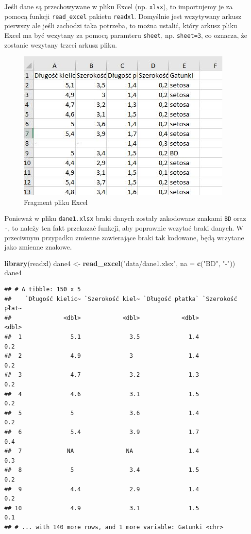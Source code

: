 \documentclass[]{book}
\newenvironment{Shaded}{\begin{snugshade}}{\end{snugshade}}
\newcommand{\DataTypeTok}[1]{\textcolor[rgb]{0.13,0.29,0.53}{#1}}
\newcommand{\KeywordTok}[1]{\textcolor[rgb]{0.13,0.29,0.53}{\textbf{#1}}}
\newcommand{\NormalTok}[1]{#1}
\newcommand{\StringTok}[1]{\textcolor[rgb]{0.31,0.60,0.02}{#1}}
\theoremstyle{plain}
\theoremstyle{definition}
\theoremstyle{definition}
\theoremstyle{definition}
\theoremstyle{definition}
\theoremstyle{remark}
\begin{document}
Jeśli dane są przechowywane w pliku Excel (np. \texttt{xlsx}), to importujemy je za pomocą funkcji \texttt{read\_excel} pakietu \texttt{readxl}. Domyślnie jest wczytywany arkusz pierwszy ale jeśli zachodzi taka potrzeba, to można ustalić, który arkusz pliku Excel ma być wczytany za pomocą paramteru \texttt{sheet}, np. \texttt{sheet=3}, co oznacza, że zostanie wczytany trzeci arkusz pliku.

\begin{figure}
\centering
\includegraphics{images/excel.jpg}
\caption{\label{fig:excel}Fragment pliku Excel}
\end{figure}

Ponieważ w pliku \texttt{dane1.xlsx} braki danych zostały zakodowane znakami \texttt{BD} oraz \texttt{-}, to należy ten fakt przekazać funkcji, aby poprawnie wczytać braki danych. W przeciwnym przypadku zmienne zawierające braki tak kodowane, będą wczytane jako zmienne znakowe.

\begin{Shaded}
\begin{Highlighting}[]
\KeywordTok{library}\NormalTok{(readxl)}
\NormalTok{dane4 <-}\StringTok{ }\KeywordTok{read_excel}\NormalTok{(}\StringTok{"data/dane1.xlsx"}\NormalTok{, }\DataTypeTok{na =} \KeywordTok{c}\NormalTok{(}\StringTok{"BD"}\NormalTok{, }\StringTok{"-"}\NormalTok{))}
\NormalTok{dane4}
\end{Highlighting}
\end{Shaded}

\begin{verbatim}
## # A tibble: 150 x 5
##    `Długość kielic~ `Szerokość kiel~ `Długość płatka` `Szerokość płat~
##               <dbl>            <dbl>            <dbl>            <dbl>
##  1              5.1              3.5              1.4              0.2
##  2              4.9              3                1.4              0.2
##  3              4.7              3.2              1.3              0.2
##  4              4.6              3.1              1.5              0.2
##  5              5                3.6              1.4              0.2
##  6              5.4              3.9              1.7              0.4
##  7             NA               NA                1.4              0.3
##  8              5                3.4              1.5              0.2
##  9              4.4              2.9              1.4              0.2
## 10              4.9              3.1              1.5              0.1
## # ... with 140 more rows, and 1 more variable: Gatunki <chr>
\end{verbatim}
\end{document}
